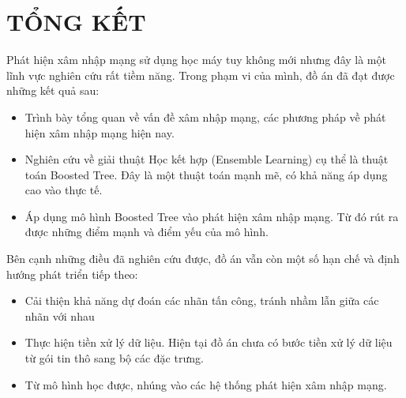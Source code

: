 \pagestyle{plain}
\chapter{TỔNG KẾT}

Phát hiện xâm nhập mạng sử dụng học máy tuy không mới nhưng đây là một lĩnh vực nghiên cứu rất tiềm năng. Trong phạm vi của mình, đồ án đã đạt được những kết quả sau:

\begin{itemize}
    \item Trình bày tổng quan về vấn đề xâm nhập mạng, các phương pháp về phát hiện xâm nhập mạng hiện nay.
    \item Nghiên cứu về giải thuật Học kết hợp (Ensemble Learning) cụ thể là thuật toán Boosted Tree. Đây là một thuật toán mạnh mẽ, có khả năng áp dụng cao vào thực tế.
    \item Áp dụng mô hình Boosted Tree vào phát hiện xâm nhập mạng. Từ đó rút ra được những điểm mạnh và điểm yếu của mô hình.
\end{itemize}

Bên cạnh những điều đã nghiên cứu được, đồ án vẫn còn một số hạn chế và định hướng phát triển tiếp theo:
\begin{itemize}
    \item Cải thiện khả năng dự đoán các nhãn tấn công, tránh nhầm lẫn giữa các nhãn với nhau
    \item Thực hiện tiền xử lý dữ liệu. Hiện tại đồ án chưa có bước tiền xử lý dữ liệu từ gói tin thô sang bộ các đặc trưng.
    \item Từ mô hình học được, nhúng vào các hệ thống phát hiện xâm nhập mạng.
\end{itemize}